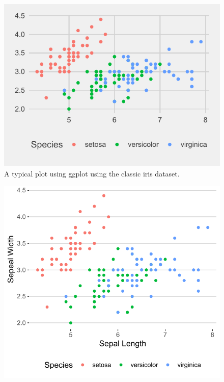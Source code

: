 \documentclass[article,30pt,extrafontsizes]{memoir}
\begin{document}
\begin{adjmulticols*}{3}{10mm}{10mm}
{

\vspace{1in}

\begin{figure}

{\centering \includegraphics[width=0.75\linewidth]{skeleton_files/figure-latex/unnamed-chunk-4-1} 

}

\caption{A typical plot using ggplot using the classic iris dataset.}\label{fig:unnamed-chunk-4}
\end{figure}

\vspace{1in}

\begin{figure}

{\centering \includegraphics[width=0.85\linewidth]{skeleton_files/figure-latex/unnamed-chunk-5-1} 

}
\end{figure}}
\end{adjmulticols*}
\end{document}
